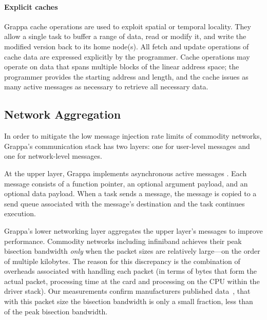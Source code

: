 \paragraph{Explicit caches} Grappa cache operations are used to exploit
spatial or temporal locality. They allow a single task to buffer a range
of data, read or modify it, and write the modified version back to its
home node(s). All fetch and update operations of cache data are
expressed explicitly by the programmer. Cache operations may operate on
data that spans multiple blocks of the linear address space; the
programmer provides the starting address and length, and the cache
issues as many active messages as necessary to retrieve all necessary
data.



\subsection{Network Aggregation}

In order to mitigate the low message injection rate limits of commodity
networks, Grappa's communication stack has two layers: one for
user-level messages and one for network-level messages. 

At the upper layer, Grappa implements asynchronous active messages
\cite{vonEicken92}. Each message consists of a function pointer, an
optional argument payload, and an optional data payload. When a task
sends a message, the message is copied to a send queue associated with
the message's destination and the task continues execution.

Grappa's lower networking layer aggregates the upper layer's messages
to improve performance. Commodity networks including infiniband
achieves their peak bisection bandwidth \emph{only} when the packet
sizes are relatively large---on the order of multiple kilobytes. The
reason for this discrepancy is the combination of overheads associated
with handling each packet (in terms of bytes that form the actual
packet, processing time at the card and processing on the
CPU within the driver stack). Our measurements confirm manufacturers
published data~\cite{infinibandbandwidth}, that with this packet size
the bisection bandwidth is only a small fraction, less than
~ of the peak bisection bandwidth.

